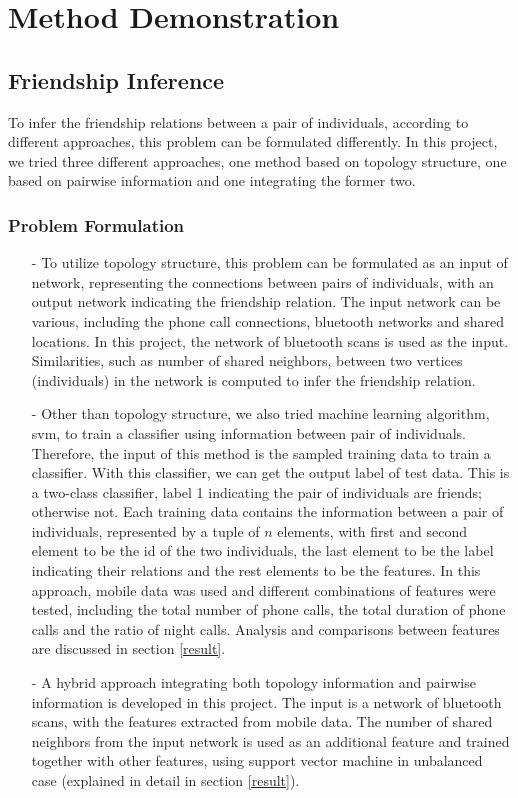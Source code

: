 \documentclass[11pt]{article}
\begin{document}
\section{Method Demonstration} \label{method}
\subsection{Friendship Inference}
To infer the friendship relations between a pair of individuals, according to different approaches, this problem can be formulated differently. In this project, we tried three different approaches, one method based on topology structure, one based on pairwise information and one integrating the former two.
\subsubsection{Problem Formulation}
\begin{itemize}
\item[-] To utilize topology structure, this problem can be formulated as an input of network, representing the connections between pairs of individuals, with an output network indicating the friendship relation. The input network can be various, including the phone call connections, bluetooth networks and shared locations. In this project, the network of bluetooth scans is used as the input. Similarities, such as number of shared neighbors, between two vertices (individuals) in the network is computed to infer the friendship relation.
\item[-] Other than topology structure, we also tried machine learning algorithm, svm, to train a classifier using information between pair of individuals. Therefore, the input of this method is the sampled training data to train a classifier. With this classifier, we can get the output label of test data. This is a two-class classifier, label 1 indicating the pair of individuals are friends; otherwise not. Each training data contains the information between a pair of individuals, represented by a tuple of $n$ elements, with first and second element to be the id of the two individuals, the last element to be the label indicating their relations and the rest elements to be the features. In this approach, mobile data was used and different combinations of features were tested, including the total number of phone calls, the total duration of phone calls and the ratio of night calls. Analysis and comparisons between features are discussed in section \ref{result}.
\item[-] A hybrid approach integrating both topology information and pairwise information is developed in this project. The input is a network of bluetooth scans, with the features extracted from mobile data. The number of shared neighbors from the input network is used as an additional feature and trained together with other features, using support vector machine in unbalanced case (explained in detail in section \ref{result}). 
\end{itemize}
\end{document}
